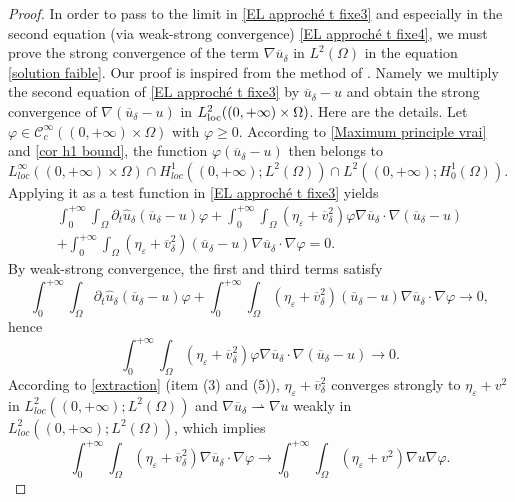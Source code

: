 \documentclass[reqno,12pt,twoside]{amsart}
\numberwithin{equation}{section} \numberwithin{theorem}{section}
\numberwithin{proposition}{section} \numberwithin{lemma}{section}
\numberwithin{corollary}{section}
\numberwithin{definition}{section} \numberwithin{remark}{section}
\begin{document}
\begin{proof}
In order to pass to the limit in \eqref{EL approché t fixe3} and especially in the second equation (via weak-strong convergence) \eqref{EL approché t fixe4}, we must prove the strong convergence of the term \(\nabla \overline{u}_\delta\) in $L^2(\Omega)$ in the equation \eqref{solution faible}. Our proof is inspired from the method of \cite{X94}. Namely we multiply the second equation of \eqref{EL approché t fixe3} by \( \overline{u}_\delta-u\) and obtain the strong convergence of \( \nabla (\overline{u}_\delta-u)\) in \(L^2_{\rm loc}((0,+\infty)\times \Omega )\). Here are the details. Let $\varphi \in \mathcal C^\infty_c((0,+\infty)\times \Omega)$ with $\varphi \geqslant 0$. According to \autoref{Maximum principle vrai} and 
\autoref{cor h1 bound}, the function $\varphi(\overline{u}_\delta-u)$ then belongs to $L_{loc}^\infty((0,+\infty)\times \Omega)\cap H_{loc}^1((0,+\infty) ; L^2(\Omega)) \cap L^2((0,+\infty); H_0^1 (\Omega))$. Applying it as a test function in \eqref{EL approché t fixe3} yields
\begin{multline*}
\int_0^{+\infty} \int_\Omega \partial_t \hat{u}_\delta(\overline{u}_\delta-u) \varphi+\int_0^{+\infty}\int_\Omega (\eta_\varepsilon+\overline{v}_\delta^2)\varphi \nabla \overline{u}_\delta\cdot \nabla (\overline{u}_\delta-u)\\
+\int_0^{+\infty}\int_\Omega (\eta_\varepsilon+\overline{v}_\delta^2)(\overline{u}_\delta-u) \nabla \overline{u}_\delta\cdot \nabla \varphi=0.
\end{multline*}
By weak-strong convergence, the first and third terms satisfy
$$\int_0^{+\infty} \int_\Omega \partial_t \hat{u}_\delta(\overline{u}_\delta-u) \varphi+\int_0^{+\infty}\int_\Omega (\eta_\varepsilon+\overline{v}_\delta^2)(\overline{u}_\delta-u) \nabla \overline{u}_\delta\cdot \nabla \varphi \to 0,$$
hence
\begin{equation}\label{existence1}
\int_0^{+\infty}\int_\Omega (\eta_\varepsilon+\overline{v}_\delta^2)\varphi \nabla \overline{u}_\delta\cdot \nabla (\overline{u}_\delta-u) \to 0.
\end{equation}
According to \autoref{extraction} (item (3) and (5)), $\eta_\varepsilon + \overline{v}_\delta ^2$ converges strongly to $\eta_\varepsilon + v^2$ in $L^2_{loc}((0,+\infty);L^2(\Omega))$  and $\nabla \overline{u}_\delta \rightharpoonup \nabla u$ weakly in $L_{loc}^2((0,+\infty);L^2(\Omega))$, which implies
\begin{equation}\label{cv b}
\int_0^{+\infty}\int_\Omega (\eta_\varepsilon + \overline{v}_\delta ^2) \nabla \overline{u}_\delta \cdot \nabla \varphi \longrightarrow \int_0^{+\infty}\int_\Omega (\eta_\varepsilon + v ^2) \nabla u \nabla \varphi.

\end{equation}
\end{proof}
\end{document}
